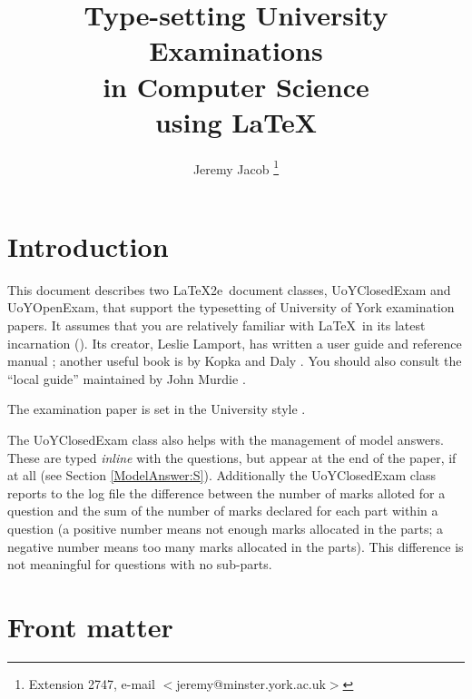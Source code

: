 \documentclass[12pt,twoside]{article}
\title{Type-setting University Examinations\\in Computer Science\\using \LaTeX}
\author{Jeremy Jacob%
        \thanks{Extension 2747, e-mail $<$jeremy@minster.york.ac.uk$>$}}
\date{\fbox{DRAFT:~\today}}
\newcommand{\kwd}[1]{\textsf{#1}}
\begin{document}
\maketitle
\section{Introduction}
This document describes two \LaTeX2e\ document classes,
\kwd{UoYClosedExam} and \kwd{UoYOpenExam}, that support the
typesetting of University of York examination papers.  It assumes that
you are relatively familiar with \LaTeX\ in its latest incarnation
(\LaTeXe).  Its creator, Leslie Lamport, has written a user guide and
reference manual \cite{Lamport1994}; another useful book is by Kopka and
Daly \cite{KopkaDaly1995}.  You should also consult the
``local guide'' maintained by John Murdie \cite{LaTeXLocalGuide}.

The examination paper is set in the University style
\cite{UoYStyleGuide}.

The \kwd{UoYClosedExam} class also helps with the management of model
answers.  These are typed \emph{inline} with the questions, but appear
at the end of the paper, if at all (see Section \ref{ModelAnswer:S}).
Additionally the \kwd{UoYClosedExam} class reports to the log file the
difference between the number of marks alloted for a question and the
sum of the number of marks declared for each \kwd{part} within a
question (a positive number means not enough marks allocated in the
parts; a negative number means too many marks allocated in the parts).
This difference is not meaningful for questions with no sub-parts.

\section{Front matter}\label{Declarations:S}
\end{document}
